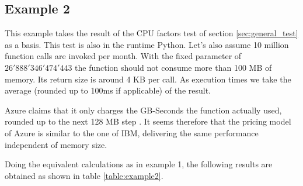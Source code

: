 \subsection*{Example 2}
This example takes the result of the \gls{CPU} factors test of section \ref{sec:general_test} as a basis. This test is also in the runtime Python. Let's also assume 10 million function calls are invoked per month. With the fixed parameter of $26'888'346'474'443$ the function should not consume more than 100 \gls{MB} of memory. Its return size is around 4 KB per call. As execution times we take the average (rounded up to 100ms if applicable) of the result.
\begin{remark}
Azure claims that it only charges the GB-Seconds the function actually used, rounded up to the next 128 \gls{MB} step \cite{AzurePricing}. It seems therefore that the pricing model of Azure is similar to the one of \gls{IBM}, delivering the same performance independent of memory size.
\end{remark}
Doing the equivalent calculations as in example 1, the following results are obtained as shown in table \ref{table:example2}.

